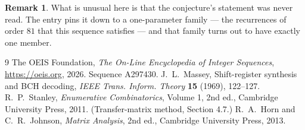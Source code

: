 \documentclass[11pt,a4paper]{article}
\theoremstyle{plain}
\theoremstyle{definition}
\newtheorem{remark}[theorem]{Remark}
\begin{document}
\begin{remark}
What is unusual here is that the conjecture's statement was never read. The entry pins it down
to a one-parameter family --- the recurrences of order $81$ that this sequence satisfies
--- and that family turns out to have exactly one member.
\end{remark}

\begin{thebibliography}{9}
 The OEIS Foundation, \emph{The On-Line Encyclopedia of Integer
Sequences}, \url{https://oeis.org}, 2026. Sequence A297430.
 J.~L.~Massey, Shift-register synthesis and BCH decoding, \emph{IEEE
Trans. Inform. Theory} \textbf{15} (1969), 122--127.
 R.~P.~Stanley, \emph{Enumerative Combinatorics}, Volume 1, 2nd ed.,
Cambridge University Press, 2011. (Transfer-matrix method, Section 4.7.)
 R.~A.~Horn and C.~R.~Johnson, \emph{Matrix Analysis}, 2nd ed., Cambridge
University Press, 2013.
\end{thebibliography}
\end{document}
